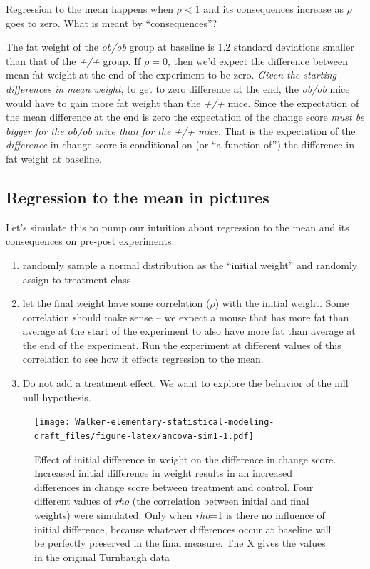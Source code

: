 \documentclass[]{book}
\providecommand{\tightlist}{%
  \setlength{\itemsep}{0pt}\setlength{\parskip}{0pt}}
\begin{document}
Regression to the mean happens when \(\rho < 1\) and its consequences increase as \(\rho\) goes to zero. What is meant by ``consequences''?

The fat weight of the \emph{ob/ob} group at baseline is 1.2 standard deviations smaller than that of the \emph{+/+} group. If \(\rho=0\), then we'd expect the difference between mean fat weight at the end of the experiment to be zero. \emph{Given the starting differences in mean weight}, to get to zero difference at the end, the \emph{ob/ob} mice would have to gain more fat weight than the \emph{+/+} mice. Since the expectation of the mean difference at the end is zero the expectation of the change score \emph{must be bigger for the ob/ob mice than for the +/+ mice}. That is the expectation of the \emph{difference} in change score is conditional on (or ``a function of'') the difference in fat weight at baseline.

\hypertarget{regression-to-the-mean-in-pictures}{%
\subsection{Regression to the mean in pictures}\label{regression-to-the-mean-in-pictures}}

Let's simulate this to pump our intuition about regression to the mean and its consequences on pre-post experiments.

\begin{enumerate}
\def\labelenumi{\arabic{enumi}.}
\tightlist
\item
  randomly sample a normal distribution as the ``initial weight'' and randomly assign to treatment class
\item
  let the final weight have some correlation (\(\rho\)) with the initial weight. Some correlation should make sense -- we expect a mouse that has more fat than average at the start of the experiment to also have more fat than average at the end of the experiment. Run the experiment at different values of this correlation to see how it effects regression to the mean.
\item
  Do not add a treatment effect. We want to explore the behavior of the nill null hypothesis.
\end{enumerate}

\begin{figure}
\centering
\texttt{[image: Walker-elementary-statistical-modeling-draft\_files/figure-latex/ancova-sim1-1.pdf]}
\caption{\label{fig:ancova-sim1}Effect of initial difference in weight on the difference in change score. Increased initial difference in weight results in an increased differences in change score between treatment and control. Four different values of \emph{rho} (the correlation between initial and final weights) were simulated. Only when \emph{rho}=1 is there no influence of initial difference, because whatever differences occur at baseline will be perfectly preserved in the final measure. The X gives the values in the original Turnbaugh data}
\end{figure}
\end{document}
